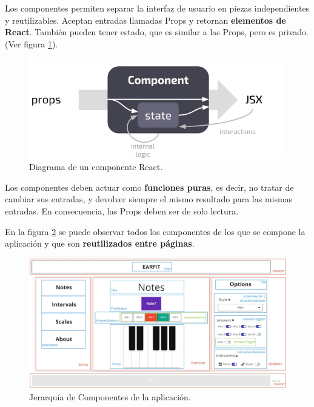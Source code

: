 \documentclass[12pt,twoside,titlepage]{report}
\begin{document}
Los componentes permiten separar la interfaz de usuario en piezas independientes y reutilizables. Aceptan entradas llamadas Props y retornan \textbf{elementos de React}. También pueden tener estado, que es similar a las Props, pero es privado.
(Ver figura \ref{fig:ReactComponent}).

\begin{figure}[H]
    \centering
    \includegraphics[scale=0.3]{React/ReactComponent}
    \caption{Diagrama de un componente React.}
    \label{fig:ReactComponent}
\end{figure}

Los componentes deben actuar como \textbf{funciones puras}, es decir, no tratar de cambiar sus entradas, y devolver siempre el mismo resultado para las mismas entradas. En consecuencia, las Props deben ser de solo lectura. 
\cite{components1}

En la figura \ref{fig:JerarquiaComponentes} se puede observar todos los componentes de los que se compone la aplicación y que son \textbf{reutilizados entre páginas}.

\begin{figure}[H]
    \centering
    \includegraphics[scale=0.28]{Detalles de Implementación/JerarquíaComponentes}
    \caption{Jerarquía de Componentes de la aplicación.}
    \label{fig:JerarquiaComponentes}
\end{figure}
\end{document}
